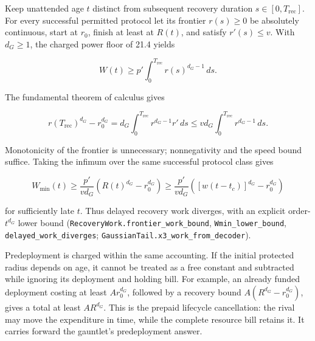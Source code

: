 \documentclass[
]{article}
\begin{document}
Keep unattended age \(t\) distinct from subsequent recovery duration
\(s\in[0,T_{\mathrm{rec}}]\). For every successful permitted protocol
let its frontier \(r(s)\ge0\) be absolutely continuous, start at
\(r_0\), finish at least at \(R(t)\), and satisfy \(r'(s)\le v\). With
\(d_G\ge1\), the charged power floor of 21.4 yields

\[
W(t)\ge p'\int_0^{T_{\mathrm{rec}}}r(s)^{d_G-1}\,ds.
\]

The fundamental theorem of calculus gives

\[
r(T_{\mathrm{rec}})^{d_G}-r_0^{d_G}
=d_G\int_0^{T_{\mathrm{rec}}}r^{d_G-1}r'\,ds
\le vd_G\int_0^{T_{\mathrm{rec}}}r^{d_G-1}\,ds.
\]

Monotonicity of the frontier is unnecessary; nonnegativity and the speed
bound suffice. Taking the infimum over the same successful protocol
class gives

\[
\boxed{
W_{\min}(t)\ge\frac{p'}{v d_G}
\left(R(t)^{d_G}-r_0^{d_G}\right)
\ge\frac{p'}{v d_G}
\left([w(t-t_c)]^{d_G}-r_0^{d_G}\right)
}
\]

for sufficiently late \(t\). Thus delayed recovery work diverges, with
an explicit order-\(t^{d_G}\) lower bound
(\texttt{R\allowbreak{}e\allowbreak{}c\allowbreak{}o\allowbreak{}v\allowbreak{}e\allowbreak{}r\allowbreak{}y\allowbreak{}W\allowbreak{}o\allowbreak{}r\allowbreak{}k\allowbreak{}.\allowbreak{}f\allowbreak{}r\allowbreak{}o\allowbreak{}n\allowbreak{}t\allowbreak{}i\allowbreak{}e\allowbreak{}r\allowbreak{}\_\allowbreak{}w\allowbreak{}o\allowbreak{}r\allowbreak{}k\allowbreak{}\_\allowbreak{}b\allowbreak{}o\allowbreak{}u\allowbreak{}n\allowbreak{}d},
\texttt{Wmin\_lower\_bound},
\texttt{d\allowbreak{}e\allowbreak{}l\allowbreak{}a\allowbreak{}y\allowbreak{}e\allowbreak{}d\allowbreak{}\_\allowbreak{}w\allowbreak{}o\allowbreak{}r\allowbreak{}k\allowbreak{}\_\allowbreak{}d\allowbreak{}i\allowbreak{}v\allowbreak{}e\allowbreak{}r\allowbreak{}g\allowbreak{}e\allowbreak{}s};
\texttt{G\allowbreak{}a\allowbreak{}u\allowbreak{}s\allowbreak{}s\allowbreak{}i\allowbreak{}a\allowbreak{}n\allowbreak{}T\allowbreak{}a\allowbreak{}i\allowbreak{}l\allowbreak{}.\allowbreak{}x\allowbreak{}3\allowbreak{}\_\allowbreak{}w\allowbreak{}o\allowbreak{}r\allowbreak{}k\allowbreak{}\_\allowbreak{}f\allowbreak{}r\allowbreak{}o\allowbreak{}m\allowbreak{}\_\allowbreak{}d\allowbreak{}e\allowbreak{}c\allowbreak{}o\allowbreak{}d\allowbreak{}e\allowbreak{}r}).

Predeployment is charged within the same accounting. If the initial
protected radius depends on age, it cannot be treated as a free constant
and subtracted while ignoring its deployment and holding bill. For
example, an already funded deployment costing at least \(A r_0^{d_G}\),
followed by a recovery bound \(A(R^{d_G}-r_0^{d_G})\), gives a total at
least \(A R^{d_G}\). This is the prepaid lifecycle cancellation: the
rival may move the expenditure in time, while the complete resource bill
retains it. It carries forward the gauntlet's predeployment answer.
\end{document}

